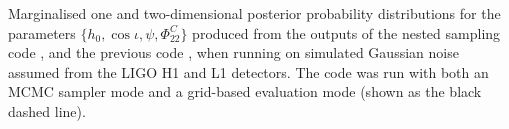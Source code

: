 \label{fig:simnoise_multi}
Marginalised one and two-dimensional posterior probability distributions
for the parameters $\{h_0, \cos{\iota}, \psi, \Phi_{22}^C\}$
produced from the outputs of the nested sampling code \lppen, and the previous
code \lppe, when running on simulated Gaussian noise assumed from the LIGO H1 and
L1 detectors. The \lppe code was run with both an MCMC sampler mode and a grid-based
evaluation mode (shown as the black dashed line).
